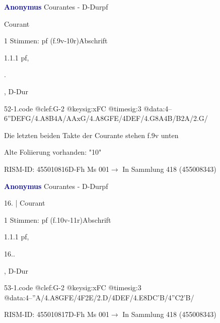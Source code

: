 \documentclass[twocolumn]{book}
\begin{document}
\par \vspace{7pt} \textcolor{darkblue}{\textbf{Anonymus  }}\hfillplus{\textbf{[52]}}\newline Courantes - D-Dur\newline pf
\par \begin{itshape}[f.10r, at left:] Courant\end{itshape} 
\par \textcolor{darkblue}{}  1 Stimmen: pf  (f.9v-10r)\newline Abschrift
\par 1.1.1  pf, \begin{itshape}[15.].\end{itshape}, D-Dur  
\begin{filecontents*}{52-1.code}
@clef:G-2
@keysig:xFC
@timesig:3
@data:4--{6''DEFG}/4.A8B4A/AAxG/4.A{8GFE}/4DEF/4.G8A4B/B2A/2.G/
\end{filecontents*}
\newline
%
\par Die letzten beiden Takte der Courante stehen f.9v unten
\par Alte Foliierung vorhanden: "10"
\par RISM-ID: 455010816\newline D-Fh  Ms 001\newline $\rightarrow$ In Sammlung 418 (455008343)
      
\par \vspace{7pt} \textcolor{darkblue}{\textbf{Anonymus  }}\hfillplus{\textbf{[53]}}\newline Courantes - D-Dur\newline pf
\par \begin{itshape}[f.10v, at left:] 16. | Courant\end{itshape} 
\par \textcolor{darkblue}{}  1 Stimmen: pf  (f.10v-11r)\newline Abschrift
\par 1.1.1  pf, \begin{itshape}16..\end{itshape}, D-Dur  
\begin{filecontents*}{53-1.code}
@clef:G-2
@keysig:xFC
@timesig:3
@data:4--''A/4.A{8GFE}/4F2E/2.D/4DEF/4.E{8DC'B}/4''C2'B/
\end{filecontents*}
\newline
%
\par RISM-ID: 455010817\newline D-Fh  Ms 001\newline $\rightarrow$ In Sammlung 418 (455008343)
      
\end{document}
